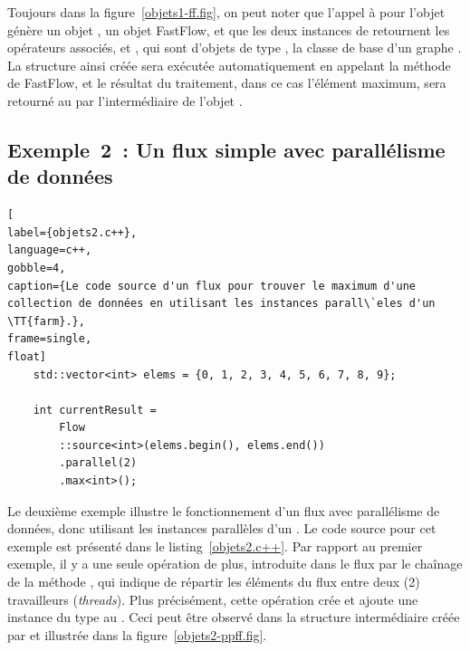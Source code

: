 Toujours dans la figure~\ref{objets1-ff.fig}, on peut noter que l'appel à  pour l'objet  g\'en\`ere un objet , un objet FastFlow, et que les deux instances de  retournent les op\'erateurs associés,  et , qui sont d'objets de type , la classe de base d'un graphe . La structure ainsi cr\'e\'ee sera ex\'ecut\'ee automatiquement en appelant la méthode  de FastFlow, et le r\'esultat du traitement, dans ce cas l'élément maximum, sera retourn\'e au  par l'interm\'ediaire de l'objet . 

 
\subsection{Exemple~2~: Un flux simple avec parallélisme de données}

\begin{lstlisting}[
label={objets2.c++},
language=c++,
gobble=4,
caption={Le code source d'un flux pour trouver le maximum d'une collection de données en utilisant les instances parall\`eles d'un \TT{farm}.},
frame=single,
float]
    std::vector<int> elems = {0, 1, 2, 3, 4, 5, 6, 7, 8, 9};

    int currentResult =
        Flow
        ::source<int>(elems.begin(), elems.end())
        .parallel(2)
        .max<int>();
\end{lstlisting}



Le deuxi\`eme exemple illustre le fonctionnement d'un flux avec parallélisme de données, donc utilisant les instances parall\`eles d'un . Le code source pour cet exemple est présenté dans le listing~\ref{objets2.c++}. Par rapport au premier exemple, il y a une seule op\'eration de plus, introduite dans le flux par le cha\^inage de la m\'ethode , qui indique de r\'epartir les \'el\'ements du flux entre deux (2) travailleurs (\emph{threads}). Plus précisément, cette op\'eration cr\'ee et ajoute une instance du type  au . Ceci peut \^etre observ\'e dans la structure interm\'ediaire cr\'e\'ee par  et illustr\'ee dans la figure~\ref{objets2-ppff.fig}.




